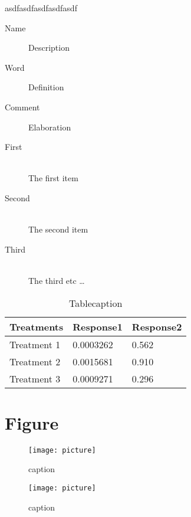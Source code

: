 \begin{corollary}
asdfasdfasdfasdfasdf
\end{corollary}

\begin{description}
\item[Name] Description
\item[Word] Definition
\item[Comment] Elaboration
\end{description}


\begin{description}
  \item[First] \hfill \\
  The first item
  \item[Second] \hfill \\
  The second item
  \item[Third] \hfill \\
  The third etc \ldots
\end{description}


\begin{table}[h]
\centering
\begin{tabular}{l l l}
\toprule
\textbf{Treatments} & \textbf{Response1} & \textbf{Response2}\\
\midrule
Treatment 1 & 0.0003262 & 0.562 \\
Treatment 2 & 0.0015681 & 0.910 \\
Treatment 3 & 0.0009271 & 0.296 \\
\bottomrule
\end{tabular}
\caption{Tablecaption}
\end{table}


\section{Figure}

\begin{figure}[h]
\centering
\texttt{[image: picture]}
\caption{caption}
\end{figure}

\begin{figure}[h]
\centering
\texttt{[image: picture]}
\caption{caption}
\end{figure}



\vspace{\baselineskip}

